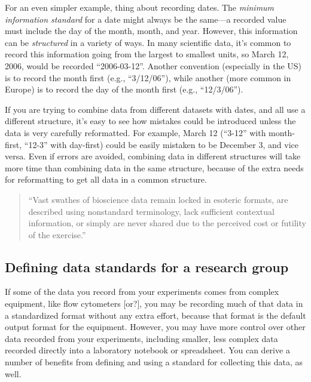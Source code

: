 \documentclass[]{tufte-book}
\begin{document}
For an even simpler example, thing about recording dates. The \emph{minimum
information standard} for a date might always be the same---a recorded value
must include the day of the month, month, and year. However, this information
can be \emph{structured} in a variety of ways. In many scientific data, it's common
to record this information going from the largest to smallest units, so March
12, 2006, would be recorded ``2006-03-12''. Another convention (especially in the
US) is to record the month first (e.g., ``3/12/06''), while another (more common
in Europe) is to record the day of the month first (e.g., ``12/3/06'').

If you are trying to combine data from different datasets with dates, and all
use a different structure, it's easy to see how mistakes could be introduced
unless the data is very carefully reformatted. For example, March 12 (``3-12''
with month-first, ``12-3'' with day-first) could be easily mistaken to be December
3, and vice versa. Even if errors are avoided, combining data in different
structures will take more time than combining data in the same structure,
because of the extra needs for reformatting to get all data in a common
structure.

\begin{quote}
``Vast swathes of bioscience data remain locked in esoteric formats, are
described using nonstandard terminology, lack sufficient contextual information,
or simply are never shared due to the perceived cost or futility of the
exercise.'' \citep{sansone2012toward}
\end{quote}

\hypertarget{defining-data-standards-for-a-research-group}{%
\subsection{Defining data standards for a research group}\label{defining-data-standards-for-a-research-group}}

If some of the data you record from your experiments comes from complex
equipment, like flow cytometers {[}or?{]}, you may be recording much of that data in
a standardized format without any extra effort, because that format is the
default output format for the equipment. However, you may have more control over
other data recorded from your experiments, including smaller, less complex data
recorded directly into a laboratory notebook or spreadsheet. You can derive a
number of benefits from defining and using a standard for collecting this data,
as well.
\end{document}

